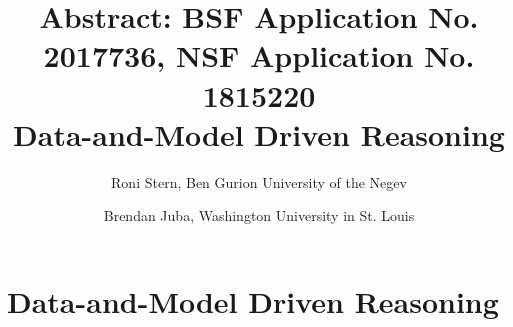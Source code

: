 \documentclass[12pt]{article}
\begin{document}
\title{\large{Abstract: BSF Application No. 2017736, NSF Application No. 1815220}\\
\Large{Data-and-Model Driven Reasoning}}
\date{\vspace{-0.5cm}}
\author{Roni Stern, Ben Gurion University of the Negev \and Brendan Juba, Washington University in St. Louis}
\maketitle
\section*{Data-and-Model Driven Reasoning}




\end{document}
